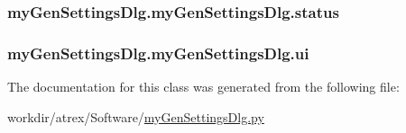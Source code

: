 \hypertarget{classmy_gen_settings_dlg_1_1my_gen_settings_dlg_a0a6c727a9bd3bc9a5eccb189f58e0a6a}{
\subsubsection[{status}]{\setlength{\rightskip}{0pt plus 5cm}my\-Gen\-Settings\-Dlg.\-my\-Gen\-Settings\-Dlg.\-status}}\label{classmy_gen_settings_dlg_1_1my_gen_settings_dlg_a0a6c727a9bd3bc9a5eccb189f58e0a6a}
\hypertarget{classmy_gen_settings_dlg_1_1my_gen_settings_dlg_a7273bd37d323cb99b1babfe474fb0794}{
\subsubsection[{ui}]{\setlength{\rightskip}{0pt plus 5cm}my\-Gen\-Settings\-Dlg.\-my\-Gen\-Settings\-Dlg.\-ui}}\label{classmy_gen_settings_dlg_1_1my_gen_settings_dlg_a7273bd37d323cb99b1babfe474fb0794}


The documentation for this class was generated from the following file\-:\begin{DoxyCompactItemize}
\item 
workdir/atrex/\-Software/\hyperlink{my_gen_settings_dlg_8py}{my\-Gen\-Settings\-Dlg.\-py}\end{DoxyCompactItemize}
